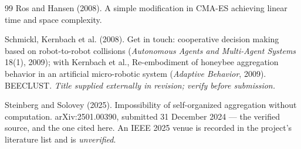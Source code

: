 \documentclass[11pt,a4paper]{article}
\begin{document}
\begin{thebibliography}{99}
Ros and Hansen (2008).
\newblock A simple modification in CMA-ES achieving linear time and space
complexity.

Schmickl, Kernbach et al. (2008).
\newblock Get in touch: cooperative decision making based on robot-to-robot
collisions (\emph{Autonomous Agents and Multi-Agent Systems} 18(1), 2009); with
Kernbach et al., Re-embodiment of honeybee aggregation behavior in an artificial
micro-robotic system (\emph{Adaptive Behavior}, 2009). BEECLUST.
\newblock \textit{Title supplied externally in revision; verify before submission.}

Steinberg and Solovey (2025).
\newblock Impossibility of self-organized aggregation without computation.
\newblock arXiv:2501.00390, submitted 31 December 2024 --- the verified source,
and the one cited here. An IEEE 2025 venue is recorded in the project's
literature list and is \textit{unverified}.

\end{thebibliography}
\end{document}

